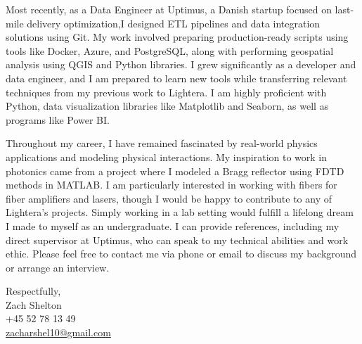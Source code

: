 \documentclass[11pt,a4]{article}
\begin{document}
Most recently, as a Data Engineer at Uptimus, a Danish startup focused on last-mile delivery optimization,I designed ETL pipelines and data integration solutions using Git. My work involved preparing production-ready scripts using tools like Docker, Azure, and PostgreSQL, along with performing geospatial analysis using QGIS and Python libraries. I grew significantly as a developer and data engineer, and I am prepared to learn new tools while transferring relevant techniques from my previous work to Lightera. I am highly proficient with Python, data visualization libraries like Matplotlib and Seaborn, as well as programs like Power BI.

Throughout my career, I have remained fascinated by real-world physics applications and modeling physical interactions. My inspiration to work in photonics came from a project where I modeled a Bragg reflector using FDTD methods in MATLAB. I am particularly interested in working with fibers for fiber amplifiers and lasers, though I would be happy to contribute to any of Lightera's projects. Simply working in a lab setting would fulfill a lifelong dream I made to myself as an undergraduate. I can provide references, including my direct supervisor at Uptimus, who can speak to my technical abilities and work ethic. Please feel free to contact me via phone or email to discuss my background or arrange an interview.

\vspace{0.5cm}
\raggedright
Respectfully, \\ Zach Shelton 
\\ 
+45 52 78 13 49 \\ 
\href{mailto:zacharshel10@gmail.com}{zacharshel10@gmail.com} 
\end{document}
